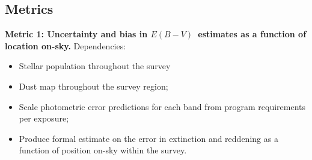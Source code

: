 
\subsection{Metrics}

\label{sec:\secname:metrics}

{\bf Metric 1: Uncertainty and bias in $E(B-V)$~estimates as a
  function of location on-sky.} Dependencies:

\begin{itemize}
  \item Stellar population throughout the survey %
    \item Dust map throughout the survey region;
    \item Scale photometric error predictions for each band from program requirements per exposure;
      \item Produce formal estimate on the error in extinction and reddening as a function of position on-sky within the survey.
\end{itemize}









